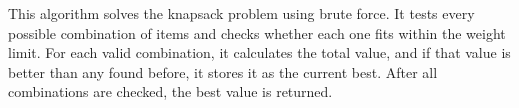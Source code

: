 This algorithm solves the knapsack problem using brute force. It tests every possible combination of items and checks whether each one fits within the weight limit. For each valid combination, it calculates the total value, and if that value is better than any found before, it stores it as the current best. After all combinations are checked, the best value is returned.